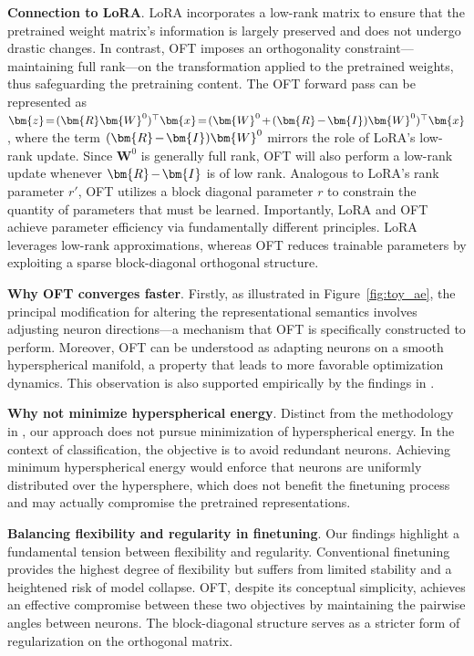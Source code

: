 \textbf{Connection to LoRA}. LoRA incorporates a low-rank matrix to ensure that the pretrained weight matrix's information is largely preserved and does not undergo drastic changes. In contrast, OFT imposes an orthogonality constraint—maintaining full rank—on the transformation applied to the pretrained weights, thus safeguarding the pretraining content. The OFT forward pass can be represented as $\thickmuskip=2mu \medmuskip=2mu \bm{z}=(\bm{R}\bm{W}^0)^\top\bm{x}=(\bm{W}^0+(\bm{R}-\bm{I})\bm{W}^0)^\top\bm{x}$, where the term $\thickmuskip=2mu \medmuskip=2mu (\bm{R}-\bm{I})\bm{W}^0$ mirrors the role of LoRA's low-rank update. Since $\bm{W}^0$ is generally full rank, OFT will also perform a low-rank update whenever $\thickmuskip=2mu \medmuskip=2mu \bm{R}-\bm{I}$ is of low rank. Analogous to LoRA’s rank parameter $r'$, OFT utilizes a block diagonal parameter $r$ to constrain the quantity of parameters that must be learned. Importantly, LoRA and OFT achieve parameter efficiency via fundamentally different principles. LoRA leverages low-rank approximations, whereas OFT reduces trainable parameters by exploiting a sparse block-diagonal orthogonal structure.

\textbf{Why OFT converges faster}. Firstly, as illustrated in Figure~\ref{fig:toy_ae}, the principal modification for altering the representational semantics involves adjusting neuron directions—a mechanism that OFT is specifically constructed to perform. Moreover, OFT can be understood as adapting neurons on a smooth hyperspherical manifold, a property that leads to more favorable optimization dynamics. This observation is also supported empirically by the findings in \cite{liu2021orthogonal}.

\textbf{Why not minimize hyperspherical energy}. Distinct from the methodology in \cite{liu2021orthogonal}, our approach does not pursue minimization of hyperspherical energy. In the context of classification, the objective is to avoid redundant neurons. Achieving minimum hyperspherical energy would enforce that neurons are uniformly distributed over the hypersphere, which does not benefit the finetuning process and may actually compromise the pretrained representations.

\textbf{Balancing flexibility and regularity in finetuning}. Our findings highlight a fundamental tension between flexibility and regularity. Conventional finetuning provides the highest degree of flexibility but suffers from limited stability and a heightened risk of model collapse. OFT, despite its conceptual simplicity, achieves an effective compromise between these two objectives by maintaining the pairwise angles between neurons. The block-diagonal structure serves as a stricter form of regularization on the orthogonal matrix.

